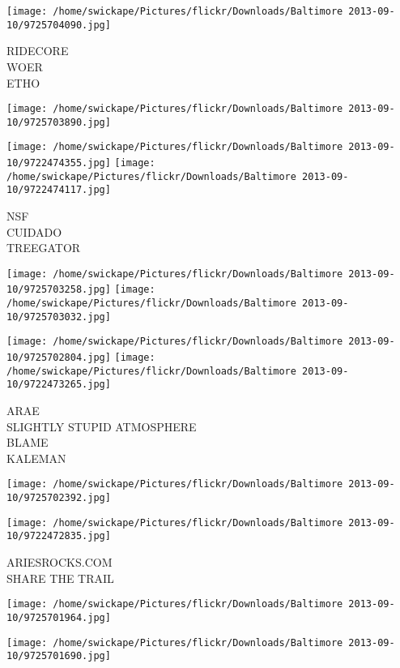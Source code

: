 \documentclass[10pt,letterpaper]{article}
\begin{document}
\texttt{[image: /home/swickape/Pictures/flickr/Downloads/Baltimore 2013-09-10/9725704090.jpg]}

RIDECORE\\
WOER\\
ETHO\\
\pagebreak

\texttt{[image: /home/swickape/Pictures/flickr/Downloads/Baltimore 2013-09-10/9725703890.jpg]}

\vspace{0.25in}
\texttt{[image: /home/swickape/Pictures/flickr/Downloads/Baltimore 2013-09-10/9722474355.jpg]}
\texttt{[image: /home/swickape/Pictures/flickr/Downloads/Baltimore 2013-09-10/9722474117.jpg]}

NSF\\
CUIDADO\\
TREEGATOR\\
\pagebreak

\texttt{[image: /home/swickape/Pictures/flickr/Downloads/Baltimore 2013-09-10/9725703258.jpg]}
\texttt{[image: /home/swickape/Pictures/flickr/Downloads/Baltimore 2013-09-10/9725703032.jpg]}

\texttt{[image: /home/swickape/Pictures/flickr/Downloads/Baltimore 2013-09-10/9725702804.jpg]}
\texttt{[image: /home/swickape/Pictures/flickr/Downloads/Baltimore 2013-09-10/9722473265.jpg]}

ARAE\\
SLIGHTLY STUPID ATMOSPHERE\\
BLAME\\
KALEMAN\\
\pagebreak

\texttt{[image: /home/swickape/Pictures/flickr/Downloads/Baltimore 2013-09-10/9725702392.jpg]}

\vspace{0.25in}
\texttt{[image: /home/swickape/Pictures/flickr/Downloads/Baltimore 2013-09-10/9722472835.jpg]}

ARIESROCKS.COM\\
SHARE THE TRAIL\\
\pagebreak

\texttt{[image: /home/swickape/Pictures/flickr/Downloads/Baltimore 2013-09-10/9725701964.jpg]}

\vspace{0.25in}
\texttt{[image: /home/swickape/Pictures/flickr/Downloads/Baltimore 2013-09-10/9725701690.jpg]}
\end{document}
